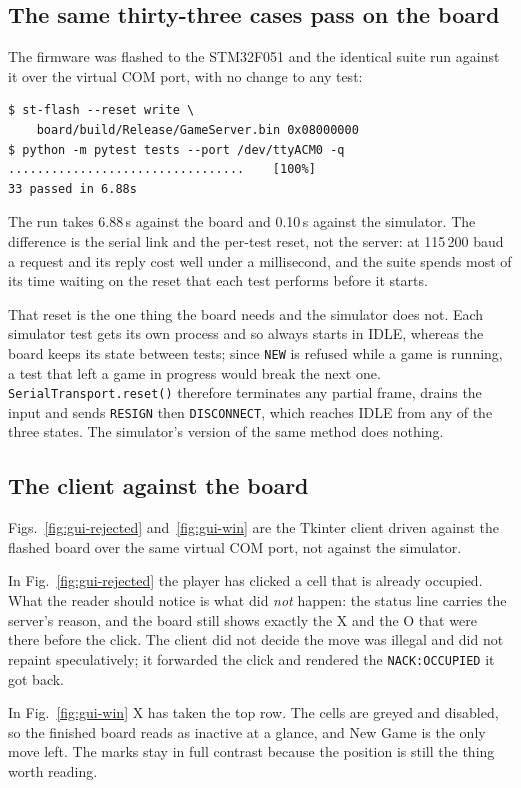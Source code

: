 \subsection{The same thirty-three cases pass on the board}
The firmware was flashed to the STM32F051 and the identical suite run against
it over the virtual COM port, with no change to any test:

{\footnotesize
\begin{verbatim}
$ st-flash --reset write \
    board/build/Release/GameServer.bin 0x08000000
$ python -m pytest tests --port /dev/ttyACM0 -q
.................................    [100%]
33 passed in 6.88s
\end{verbatim}}

The run takes 6.88\,s against the board and 0.10\,s against the simulator. The
difference is the serial link and the per-test reset, not the server: at
115\,200 baud a request and its reply cost well under a millisecond, and the
suite spends most of its time waiting on the reset that each test performs
before it starts.

That reset is the one thing the board needs and the simulator does not. Each
simulator test gets its own process and so always starts in IDLE, whereas the
board keeps its state between tests; since \texttt{NEW} is refused while a game
is running, a test that left a game in progress would break the next one.
\texttt{SerialTransport.reset()} therefore terminates any partial frame, drains
the input and sends \texttt{RESIGN} then \texttt{DISCONNECT}, which reaches
IDLE from any of the three states. The simulator's version of the same method
does nothing.

\subsection{The client against the board}
Figs.~\ref{fig:gui-rejected} and~\ref{fig:gui-win} are the Tkinter client
driven against the flashed board over the same virtual COM port, not against
the simulator.

In Fig.~\ref{fig:gui-rejected} the player has clicked a cell that is already
occupied. What the reader should notice is what did \emph{not} happen: the
status line carries the server's reason, and the board still shows exactly the
X and the O that were there before the click. The client did not decide the
move was illegal and did not repaint speculatively; it forwarded the click and
rendered the \texttt{NACK:OCCUPIED} it got back.

In Fig.~\ref{fig:gui-win} X has taken the top row. The cells are greyed and
disabled, so the finished board reads as inactive at a glance, and New Game is
the only move left. The marks stay in full contrast because the position is
still the thing worth reading.

